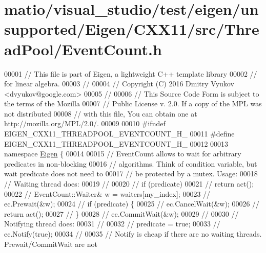 \hypertarget{matio_2visual__studio_2test_2eigen_2unsupported_2_eigen_2_c_x_x11_2src_2_thread_pool_2_event_count_8h_source}{}\section{matio/visual\+\_\+studio/test/eigen/unsupported/\+Eigen/\+C\+X\+X11/src/\+Thread\+Pool/\+Event\+Count.h}
\label{matio_2visual__studio_2test_2eigen_2unsupported_2_eigen_2_c_x_x11_2src_2_thread_pool_2_event_count_8h_source}

\begin{DoxyCode}
00001 \textcolor{comment}{// This file is part of Eigen, a lightweight C++ template library}
00002 \textcolor{comment}{// for linear algebra.}
00003 \textcolor{comment}{//}
00004 \textcolor{comment}{// Copyright (C) 2016 Dmitry Vyukov <dvyukov@google.com>}
00005 \textcolor{comment}{//}
00006 \textcolor{comment}{// This Source Code Form is subject to the terms of the Mozilla}
00007 \textcolor{comment}{// Public License v. 2.0. If a copy of the MPL was not distributed}
00008 \textcolor{comment}{// with this file, You can obtain one at http://mozilla.org/MPL/2.0/.}
00009 
00010 \textcolor{preprocessor}{#ifndef EIGEN\_CXX11\_THREADPOOL\_EVENTCOUNT\_H\_}
00011 \textcolor{preprocessor}{#define EIGEN\_CXX11\_THREADPOOL\_EVENTCOUNT\_H\_}
00012 
00013 \textcolor{keyword}{namespace }\hyperlink{namespace_eigen}{Eigen} \{
00014 
00015 \textcolor{comment}{// EventCount allows to wait for arbitrary predicates in non-blocking}
00016 \textcolor{comment}{// algorithms. Think of condition variable, but wait predicate does not need to}
00017 \textcolor{comment}{// be protected by a mutex. Usage:}
00018 \textcolor{comment}{// Waiting thread does:}
00019 \textcolor{comment}{//}
00020 \textcolor{comment}{//   if (predicate)}
00021 \textcolor{comment}{//     return act();}
00022 \textcolor{comment}{//   EventCount::Waiter& w = waiters[my\_index];}
00023 \textcolor{comment}{//   ec.Prewait(&w);}
00024 \textcolor{comment}{//   if (predicate) \{}
00025 \textcolor{comment}{//     ec.CancelWait(&w);}
00026 \textcolor{comment}{//     return act();}
00027 \textcolor{comment}{//   \}}
00028 \textcolor{comment}{//   ec.CommitWait(&w);}
00029 \textcolor{comment}{//}
00030 \textcolor{comment}{// Notifying thread does:}
00031 \textcolor{comment}{//}
00032 \textcolor{comment}{//   predicate = true;}
00033 \textcolor{comment}{//   ec.Notify(true);}
00034 \textcolor{comment}{//}
00035 \textcolor{comment}{// Notify is cheap if there are no waiting threads. Prewait/CommitWait are not}

\end{DoxyCode}
